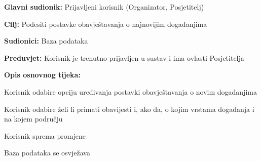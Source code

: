
\noindent {}
\begin{packed_item}
	
	\item \textbf{Glavni sudionik:} Prijavljeni korisnik (Organizator, Posjetitelj)
	\item  \textbf{Cilj:} Podesiti postavke obavještavanja o najnovijim događanjima
	\item  \textbf{Sudionici:} Baza podataka
	\item  \textbf{Preduvjet:} Korisnik je trenutno prijavljen u sustav i ima ovlasti Posjetitelja
	\item  \textbf{Opis osnovnog tijeka:}
	
	\item[] \begin{packed_enum}
		
		\item Korisnik odabire opciju uređivanja postavki obavještavanja o novim događanjima
		\item Korisnik odabire želi li primati obavijesti i, ako da, o kojim vrstama događanja i na kojem području
		\item Korisnik sprema promjene
		\item Baza podataka se osvježava
		
	\end{packed_enum}
	
	
		
			
			
		
	\end{packed_item}
	
